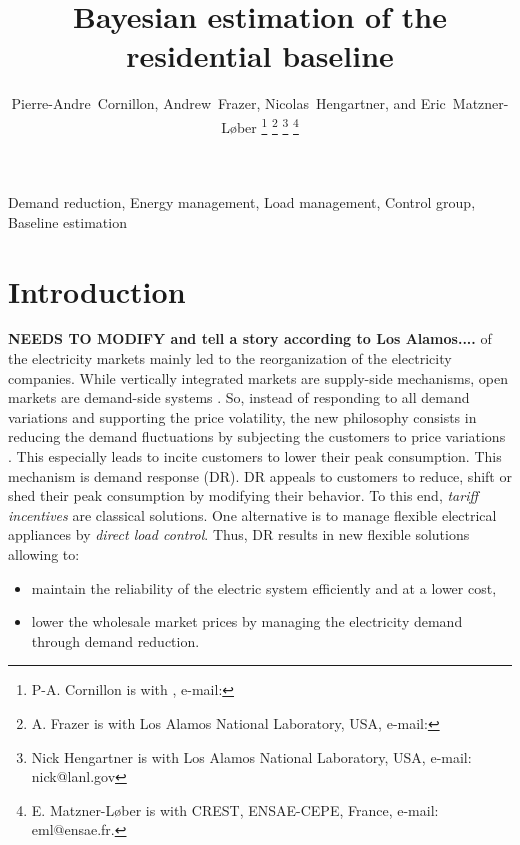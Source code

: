 \documentclass[journal]{IEEEtran}
\begin{document}
\title{Bayesian estimation of the residential baseline}

\author{Pierre-Andre~Cornillon,
Andrew~Frazer,
Nicolas~Hengartner, 
and Eric~Matzner-L{\o}ber
\thanks{P-A. Cornillon is with , e-mail: }%
\thanks{A. Frazer is with Los Alamos National Laboratory, USA, e-mail: }%
\thanks{Nick Hengartner is with Los Alamos National Laboratory, USA, e-mail: nick@lanl.gov}%
\thanks{E. Matzner-L{\o}ber is with CREST, ENSAE-CEPE, France, e-mail: eml@ensae.fr.}
}
\maketitle

\begin{abstract}

\end{abstract}

\begin{IEEEkeywords}
Demand reduction, Energy management, Load management, Control group, Baseline estimation
\end{IEEEkeywords}

\IEEEpeerreviewmaketitle

\section{Introduction}\label{sec:intro}
{\bf NEEDS TO MODIFY and tell a story according to Los Alamos....}
 of the electricity markets mainly led
to the reorganization of the electricity companies. While vertically
integrated markets are supply-side mechanisms, open markets are
demand-side systems \cite{IEA}. So, instead of responding to all
demand variations and supporting the price volatility, the new
philosophy consists in reducing the demand fluctuations by subjecting
the customers to price variations \cite{def_DR}.  This especially
leads to incite customers to lower their peak consumption. This
mechanism is demand response (DR). DR appeals to customers to reduce,
shift or shed their peak consumption by modifying their behavior. To
this end, \emph{tariff incentives} are classical solutions. One
alternative is to manage flexible electrical appliances by
\emph{direct load control}. Thus, DR results in new flexible solutions
allowing to:
\begin{itemize}
\item maintain the reliability of the electric system efficiently and at a lower cost,
\item lower the wholesale market prices by managing the electricity demand through demand reduction.
\end{itemize}  
\end{document}
